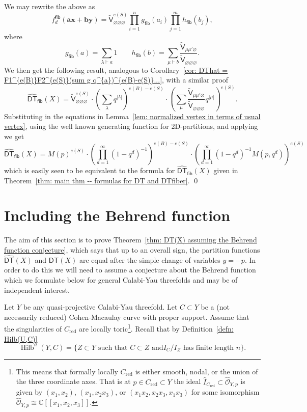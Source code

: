 \documentclass[12pt]{amsart}
\theoremstyle{definition}
\newcommand{\CC} {\mathbb{C}}          %
\newcommand{\sfVtilde}{\widetilde{\mathsf{V}}}
\newcommand{\Hilb}{\operatorname{Hilb}}
\newcommand{\DT}{\mathsf{DT}}
\newcommand{\boldx}{\boldsymbol{x}}
\newcommand{\boldy}{\boldsymbol{y}}
\newcommand{\bolda}{\boldsymbol{a}}
\newcommand{\boldb}{\boldsymbol{b}}
\renewcommand{\emptyset}{\varnothing}
\newcommand{\DThat}{\widehat{\DT}}
\newcommand{\fiber}{\mathsf{fib}}
\newcommand{\red}{\mathrm{red}}
\newcommand{\presectionspace}{\vspace{0.2cm}} %
\begin{document}
We may rewrite the above as 
\[
f^{\fiber}_{d}(\bolda \boldx +\boldb \boldy ) = \sfVtilde_{\emptyset
\emptyset \emptyset}^{e(S)} \prod_{i=1}^{n} g_{\fiber}(a_{i})
\prod_{j=1}^{m} h_{\fiber}(b_{j}),
\]
where
\[
g_{\fiber}(a)  = \sum_{\lambda \vdash a} 1 \quad \quad h_{\fiber}(b)
=\sum_{\mu \vdash b} \frac{\sfVtilde_{\mu \mu'
\emptyset}}{\sfVtilde_{\emptyset \emptyset \emptyset}}. 
\]
We then get the following result, analogous to Corollary~\ref{cor:
DThat = F1^{e(B)}F2^{e(S)}(sum g q^{a})^{e(B)-e(S)}...}, with a
similar proof
\[
\DThat_{\fiber}(X) = \sfVtilde^{e(S)}_{\emptyset \emptyset \emptyset}
\cdot \left(\sum_{\lambda}q^{|\lambda |} \right)^{e(B)-e(S)} \cdot
\left(\sum_{\mu} \frac{\sfVtilde_{\mu \mu'
\emptyset}}{\sfVtilde_{\emptyset \emptyset \emptyset}} q^{|\mu |}
\right)^{e(S)}.
\]
Substituting in the equations in Lemma~\ref{lem: normalized vertex in
terms of usual vertex}, using the well known generating function for
2D-partitions, and applying \cite[eqn~(1)]{Bryan-Kool-Young}
we get
\[
\DThat_{\fiber}(X) = M(p)^{e(S)} \cdot \left(\prod_{d=1}^{\infty}
(1-q^{d})^{-1} \right)^{e(B)-e(S)} \cdot  \left(\prod_{d=1}^{\infty}
(1-q^{d})^{-1} M(p,q^{d}) \right)^{e(S)} 
\]
which is easily seen to be equivalent to the formula for
$\DThat_{\fiber}(X)$ given in Theorem~\ref{thm: main thm -- formulas
for DT and DTfiber}. \qed  




\presectionspace
\section{Including the Behrend function} \label{sec: Behrend}

The aim of this section is to prove Theorem~\ref{thm: DT(X) assuming
the Behrend function conjecture}, which says that up to an overall
sign, the partition functions $\DThat (X)$ and $\DT (X)$ are equal
after the simple change of variables $y=-p$. In order to do this we
will need to assume a conjecture about the Behrend function which we
formulate below for general Calabi-Yau threefolds and may be of
independent interest.

Let $Y$ be any quasi-projective Calabi-Yau
threefold.  Let $C\subset Y$ be a (not necessarily reduced)
Cohen-Macaulay curve with proper support. Assume that the
singularities of $C_{\red}$ are locally toric\footnote{This means that
formally locally $C_{\red}$ is either smooth, nodal, or the union of
the three coordinate axes. That is at $p\in C_{\red}\subset Y$ the
ideal $\widehat{I}_{C_{\red}}\subset \widehat{\mathcal{O}}_{Y,p}$ is
given by $(x_{1},x_{2})$, $(x_{1},x_{2}x_{3})$, or
$(x_{1}x_{2},x_{2}x_{3},x_{1}x_{3})$ for some isomorphism
$\widehat{\mathcal{O}}_{Y,p}\cong \CC
[[x_{1},x_{2},x_{3}]]$. }. Recall that by Definition~\ref{defn:
Hilb(U,C)} 
\[
\Hilb^{n}(Y,C) = \{Z\subset Y \text{ such that $C\subset Z$ and
$I_{C}/I_{Z}$ has finite length $n$} \}.
\]
\end{document}
